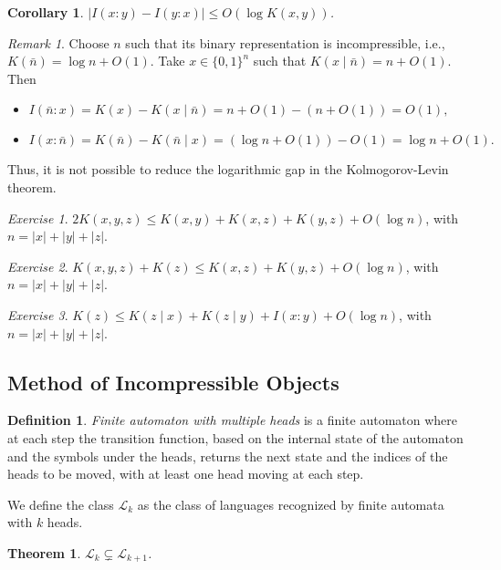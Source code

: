 \documentclass[12pt,sans]{article}
\theoremstyle{definition}
\newtheorem{definition}{Definition}[section]
\theoremstyle{plain}
\newtheorem{theorem}{Theorem}[section]
\newtheorem{corollary}{Corollary}[section]
\theoremstyle{remark}
\newtheorem{exercise}{Exercise}[section]
\newtheorem{remark}{Remark}[section]
\begin{document}
\begin{corollary}
    $|I(x:y) - I(y:x)| \le O(\log K(x,y))$.
\end{corollary}

\begin{remark}
    Choose $n$ such that its binary representation is incompressible, i.e., $K(\bar n) = \log n + O(1)$. Take $x \in \{0,1\}^n$ such that $K(x \mid \bar n) = n + O(1)$. Then
    \begin{itemize}
        \item\(
        I(\bar n : x) = K(x) - K(x \mid \bar n) = n + O(1) - (n + O(1)) = O(1),
        \)
        \item\(
        I(x : \bar n) = K(\bar n) - K(\bar n \mid x) = (\log n + O(1)) - O(1) = \log n + O(1).
        \)
    \end{itemize}
    Thus, it is not possible to reduce the logarithmic gap in the Kolmogorov-Levin theorem.
\end{remark}

\begin{exercise}
    $2K(x,y,z) \le K(x,y) + K(x,z) + K(y,z) + O(\log n)$, with $n = |x| + |y| + |z|$.
\end{exercise}

\begin{exercise}
    $K(x,y,z) + K(z) \le K(x,z) + K(y,z) + O(\log n)$, with $n = |x| + |y| + |z|$.
\end{exercise}

\begin{exercise}
    $K(z) \le K(z \mid x) + K(z \mid y) + I(x:y) + O(\log n)$, with $n = |x| + |y| + |z|$.
\end{exercise}


\subsection{Method of Incompressible Objects}
\begin{definition}
    \emph{Finite automaton with multiple heads} is a finite automaton where at each step the transition function, based on the internal state of the automaton and the symbols under the heads, returns the next state and the indices of the heads to be moved, with at least one head moving at each step.
\end{definition}

We define the class $\mathcal{L}_k$ as the class of languages recognized by finite automata with $k$ heads.

\begin{theorem}\label{thm:kDFA}
    $\mathcal{L}_k \subsetneq \mathcal{L}_{k+1}$.
\end{theorem}
\end{document}
